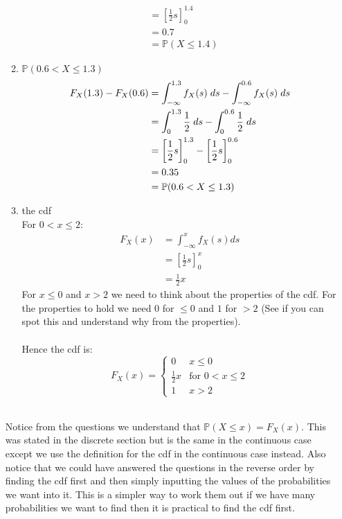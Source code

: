 \documentclass[,oneside]{article}
\begin{document}
\begin{enumerate}
\begin{enumerate}
\begin{align*}
&= \left [ \frac{1}{2}s \right ]_{0}^{1.4}\\
&= 0.7\\
&= \mathbb{P}(X \leq 1.4)
\end{align*}
\item $ \mathbb{P}(0.6 < X \leq 1.3)$
\begin{align*}
F_X(1.3) - F_X(0.6)&= \int_{-\infty}^{1.3} f_X(s) \hspace{0.1cm}ds - \int_{-\infty}^{0.6} f_X(s) \hspace{0.1cm}ds \\
&=  \int_{0}^{1.3} \frac{1}{2} \hspace{0.1cm}ds -  \int_{0}^{0.6} \frac{1}{2} \hspace{0.1cm}ds\\
&= \left [ \frac{1}{2}s \right ]_{0}^{1.3} - \left [ \frac{1}{2}s \right ]_{0}^{0.6}\\
&= 0.35\\
&= \mathbb{P}(0.6 < X \leq 1.3)
\end{align*}
\item the cdf 
\\For $0 < x \leq 2$:
\begin{align*}
F_X(x)&= \int_{-\infty }^{x} f_X(s) ds\\
&= \left [ \frac{1}{2}s \right ]_{0}^{x}\\
&= \frac{1}{2}x
\end{align*}
For $x \leq 0$ and $x > 2$ we need to think about the properties of the cdf. For the properties to hold we need $0$ for $\leq 0$ and $1$ for $ > 2$ (See if you can spot this and understand why from the properties).\\
\\Hence the cdf is:
\[
F_X(x) =
\begin{cases}
0 & x \leq 0 \\
\frac{1}{2}x & \text{for } 0 < x \leq 2 \\
1 & x > 2
\end{cases} \] \\
\end{enumerate}
Notice from the questions we understand that $\mathbb{P}(X \leq x) = F_X(x)$. This was stated in the discrete section but is the same in the continuous case except we use the definition for the cdf in the continuous case instead. Also notice that we could have answered the questions in the reverse order by finding the cdf first and then simply inputting the values of the probabilities we want into it. This is a simpler way to work them out if we have many probabilities we want to find then it is practical to find the cdf first.\\ \\

\end{enumerate}
\end{document}
